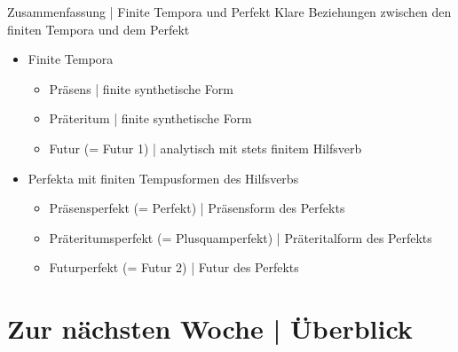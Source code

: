 \begin{frame}
  {Zusammenfassung | Finite Tempora und Perfekt}
  \onslide<+->
  \onslide<+->
  Klare Beziehungen zwischen den finiten Tempora und dem Perfekt\\
  \Zeile
  \begin{itemize}[<+->]
    \item Finite Tempora
      \begin{itemize}[<+->]
        \item Präsens | finite synthetische Form
        \item Präteritum | finite synthetische Form
        \item Futur (= Futur 1) | analytisch mit stets finitem Hilfsverb
      \end{itemize}
     \Zeile 
    \item \alert{Perfekta mit finiten Tempusformen des Hilfsverbs}
      \begin{itemize}[<+->]
        \item Präsensperfekt (= Perfekt) | Präsensform des Perfekts
        \item Präteritumsperfekt (= Plusquamperfekt) | Präteritalform des Perfekts
        \item Futurperfekt (= Futur 2) | Futur des Perfekts
      \end{itemize}
  \end{itemize}
  
\end{frame}

\ifdefined\TITLE
  \section{Zur nächsten Woche | Überblick}

